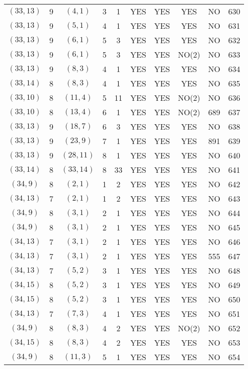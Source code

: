 \begin{longtable}{|c|c|c|c|c|c|c|c|c|c|}
$(33, 13)$ & 9 & $(4, 1)$ & 3 & 1 & YES & YES & YES & NO & 630\\
$(33, 13)$ & 9 & $(5, 1)$ & 4 & 1 & YES & YES & YES & NO & 631\\
$(33, 13)$ & 9 & $(6, 1)$ & 5 & 3 & YES & YES & YES & NO & 632\\
$(33, 13)$ & 9 & $(6, 1)$ & 5 & 3 & YES & YES & NO(2) & NO & 633\\
$(33, 13)$ & 9 & $(8, 3)$ & 4 & 1 & YES & YES & YES & NO & 634\\
$(33, 14)$ & 8 & $(8, 3)$ & 4 & 1 & YES & YES & YES & NO & 635\\
$(33, 10)$ & 8 & $(11, 4)$ & 5 & 11 & YES & YES & NO(2) & NO & 636\\
$(33, 10)$ & 8 & $(13, 4)$ & 6 & 1 & YES & YES & NO(2) & 689 & 637\\
$(33, 13)$ & 9 & $(18, 7)$ & 6 & 3 & YES & YES & YES & NO & 638\\
$(33, 13)$ & 9 & $(23, 9)$ & 7 & 1 & YES & YES & YES & 891 & 639\\
$(33, 13)$ & 9 & $(28, 11)$ & 8 & 1 & YES & YES & YES & NO & 640\\
$(33, 14)$ & 8 & $(33, 14)$ & 8 & 33 & YES & YES & YES & NO & 641\\
$(34, 9)$ & 8 & $(2, 1)$ & 1 & 2 & YES & YES & YES & NO & 642\\
$(34, 13)$ & 7 & $(2, 1)$ & 1 & 2 & YES & YES & YES & NO & 643\\
$(34, 9)$ & 8 & $(3, 1)$ & 2 & 1 & YES & YES & YES & NO & 644\\
$(34, 9)$ & 8 & $(3, 1)$ & 2 & 1 & YES & YES & YES & NO & 645\\
$(34, 13)$ & 7 & $(3, 1)$ & 2 & 1 & YES & YES & YES & NO & 646\\
$(34, 13)$ & 7 & $(3, 1)$ & 2 & 1 & YES & YES & YES & 555 & 647\\
$(34, 13)$ & 7 & $(5, 2)$ & 3 & 1 & YES & YES & YES & NO & 648\\
$(34, 15)$ & 8 & $(5, 2)$ & 3 & 1 & YES & YES & YES & NO & 649\\
$(34, 15)$ & 8 & $(5, 2)$ & 3 & 1 & YES & YES & YES & NO & 650\\
$(34, 13)$ & 7 & $(7, 3)$ & 4 & 1 & YES & YES & YES & NO & 651\\
$(34, 9)$ & 8 & $(8, 3)$ & 4 & 2 & YES & YES & NO(2) & NO & 652\\
$(34, 15)$ & 8 & $(8, 3)$ & 4 & 2 & YES & YES & YES & NO & 653\\
$(34, 9)$ & 8 & $(11, 3)$ & 5 & 1 & YES & YES & YES & NO & 654\\

\end{longtable}
